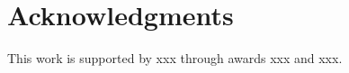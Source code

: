 \section{Acknowledgments}\label{sec:acknowlegments}

This work is supported by xxx through awards xxx and xxx. %
